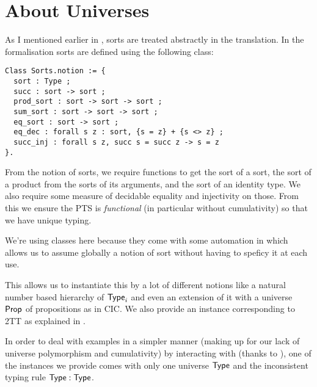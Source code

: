 

\section{About Universes}

As I mentioned earlier in , sorts are treated
abstractly in the translation. In the formalisation sorts are defined using
the following class:
%
\begin{verbatim}
Class Sorts.notion := {
  sort : Type ;
  succ : sort -> sort ;
  prod_sort : sort -> sort -> sort ;
  sum_sort : sort -> sort -> sort ;
  eq_sort : sort -> sort ;
  eq_dec : forall s z : sort, {s = z} + {s <> z} ;
  succ_inj : forall s z, succ s = succ z -> s = z
}.
\end{verbatim}
%
From the notion of sorts, we require functions to get the sort of a sort,
the sort of a product from the sorts of its arguments, and the sort of an
identity type.
We also require some measure of decidable equality and injectivity on those.
From this we ensure the \acrshort{PTS} is \emph{functional} (in particular
without cumulativity) so that we have unique typing.

We're using classes here because they come with some automation in \Coq which
allows us to assume globally a notion of sort without having to speficy it at
each use.

This allows us to instantiate this by a lot of different notions like a natural
number based hierarchy of \(\mathsf{Type}_i\) and even an extension of it with a
universe $\mathsf{Prop}$ of propositions as in \acrshort{CIC}.
We also provide an instance corresponding to \acrshort{2TT} as explained in
.

In order to deal with examples in a simpler manner (making up for our lack of
universe polymorphism and cumulativity) by interacting with \Coq (thanks to
\MetaCoq), one of the instances we provide comes with only one universe $\mathsf{Type}$
and the inconsistent typing rule $\mathsf{Type} : \mathsf{Type}$.

